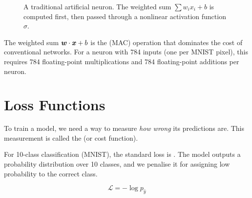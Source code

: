 \begin{figure}[htbp]
\centering
{}
\caption{A traditional artificial neuron. The weighted sum
  $\sum w_i x_i + b$ is computed first, then passed through a nonlinear
  activation function $\sigma$.}
\label{fig:neuron}
\end{figure}

The weighted sum $\bm{w} \cdot \bm{x} + b$ is the
 (MAC) operation that dominates the cost
of conventional networks. For a neuron with 784 inputs (one per MNIST
pixel), this requires 784 floating-point multiplications and 784
floating-point additions per neuron.


\section{Loss Functions}
\label{sec:loss}

To train a model, we need a way to measure \emph{how wrong} its
predictions are. This measurement is called the 
(or cost function).

For 10-class classification (MNIST), the standard loss is
. The model outputs a probability
distribution over 10 classes, and we penalise it for assigning low
probability to the correct class.

\begin{equation}
  \mathcal{L} = -\log p_{\hat{y}}
  \label{eq:cross-entropy}
\end{equation}

